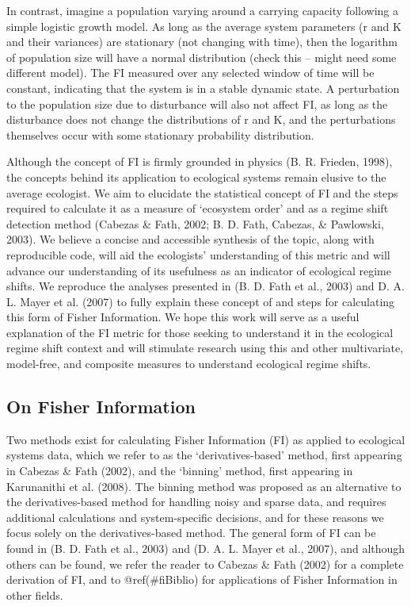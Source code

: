 \documentclass[12pt,twoside]{reedthesis}
\begin{document}
In contrast, imagine a population varying around a carrying capacity
following a simple logistic growth model. As long as the average system
parameters (r and K and their variances) are stationary (not changing
with time), then the logarithm of population size will have a normal
distribution (check this -- might need some different model). The FI
measured over any selected window of time will be constant, indicating
that the system is in a stable dynamic state. A perturbation to the
population size due to disturbance will also not affect FI, as long as
the disturbance does not change the distributions of r and K, and the
perturbations themselves occur with some stationary probability
distribution.

Although the concept of FI is firmly grounded in physics (B. R. Frieden,
1998), the concepts behind its application to ecological systems remain
elusive to the average ecologist. We aim to elucidate the statistical
concept of FI and the steps required to calculate it as a measure of
`ecosystem order' and as a regime shift detection method (Cabezas \&
Fath, 2002; B. D. Fath, Cabezas, \& Pawlowski, 2003). We believe a
concise and accessible synthesis of the topic, along with reproducible
code, will aid the ecologists' understanding of this metric and will
advance our understanding of its usefulness as an indicator of
ecological regime shifts. We reproduce the analyses presented in (B. D.
Fath et al., 2003) and D. A. L. Mayer et al. (2007) to fully explain
these concept of and steps for calculating this form of Fisher
Information. We hope this work will serve as a useful explanation of the
FI metric for those seeking to understand it in the ecological regime
shift context and will stimulate research using this and other
multivariate, model-free, and composite measures to understand
ecological regime shifts.

\subsection{On Fisher Information}\label{on-fisher-information}

Two methods exist for calculating Fisher Information (FI) as applied to
ecological systems data, which we refer to as the `derivatives-based'
method, first appearing in Cabezas \& Fath (2002), and the `binning'
method, first appearing in Karunanithi et al. (2008). The binning method
was proposed as an alternative to the derivatives-based method for
handling noisy and sparse data, and requires additional calculations and
system-specific decisions, and for these reasons we focus solely on the
derivatives-based method. The general form of FI can be found in (B. D.
Fath et al., 2003) and (D. A. L. Mayer et al., 2007), and although
others can be found, we refer the reader to Cabezas \& Fath (2002) for a
complete derivation of FI, and to @ref(\#fiBiblio) for applications of
Fisher Information in other fields.
\end{document}

